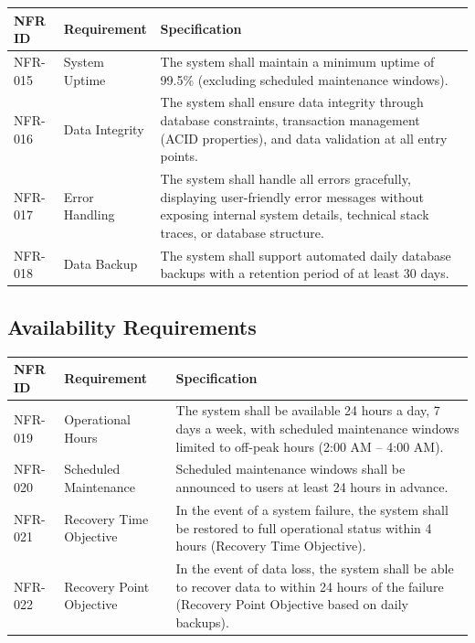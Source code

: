 \documentclass[12pt,a4paper,oneside]{report}
\begin{document}
\begin{table}[htbp]
\centering
\small
\begin{tabularx}{\textwidth}{l l X}
\toprule
\textbf{NFR ID} & \textbf{Requirement} & \textbf{Specification} \\
\midrule
NFR-015 & System Uptime & The system shall maintain a minimum uptime of 99.5\% (excluding scheduled maintenance windows). \\
NFR-016 & Data Integrity & The system shall ensure data integrity through database constraints, transaction management (ACID properties), and data validation at all entry points. \\
NFR-017 & Error Handling & The system shall handle all errors gracefully, displaying user-friendly error messages without exposing internal system details, technical stack traces, or database structure. \\
NFR-018 & Data Backup & The system shall support automated daily database backups with a retention period of at least 30 days. \\
\bottomrule
\end{tabularx}
\end{table}

\subsection{Availability Requirements}

\begin{table}[htbp]
\centering
\small
\begin{tabularx}{\textwidth}{l l X}
\toprule
\textbf{NFR ID} & \textbf{Requirement} & \textbf{Specification} \\
\midrule
NFR-019 & Operational Hours & The system shall be available 24 hours a day, 7 days a week, with scheduled maintenance windows limited to off-peak hours (2:00 AM – 4:00 AM). \\
NFR-020 & Scheduled Maintenance & Scheduled maintenance windows shall be announced to users at least 24 hours in advance. \\
NFR-021 & Recovery Time Objective & In the event of a system failure, the system shall be restored to full operational status within 4 hours (Recovery Time Objective). \\
NFR-022 & Recovery Point Objective & In the event of data loss, the system shall be able to recover data to within 24 hours of the failure (Recovery Point Objective based on daily backups). \\
\bottomrule
\end{tabularx}
\end{table}
\end{document}
